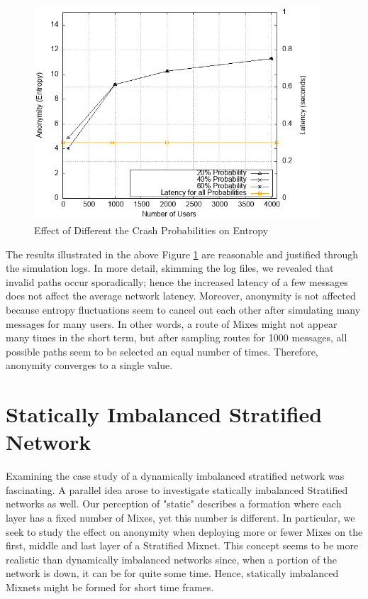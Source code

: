 \documentclass[logo,msc,cyber]{infthesis}   %
\begin{document}
\begin{figure}[h!]
    \centering
    \includegraphics[height=8cm]{figures/simulator_extentions/mix_failure.png}
    \caption{Effect of Different the Crash Probabilities on Entropy}
    \label{fig:dynamic-crash-probability}
\end{figure}    


The results illustrated in the above Figure \ref{fig:dynamic-crash-probability}
are reasonable and justified through the simulation logs. In more detail,
skimming the log files, we revealed that invalid paths occur sporadically; hence
the increased latency of a few messages does not affect the average network
latency. Moreover, anonymity is not affected because entropy fluctuations seem
to cancel out each other after simulating many messages for many users. In other
words, a route of Mixes might not appear many times in the short term, but after
sampling routes for 1000 messages, all possible paths seem to be selected an
equal number of times. Therefore, anonymity converges to a single value.

\section{Statically Imbalanced Stratified Network}

Examining the case study of a dynamically imbalanced stratified network was
fascinating. A parallel idea arose to investigate statically imbalanced
Stratified networks as well. Our perception of "static" describes a formation
where each layer has a fixed number of Mixes, yet this number is different. In
particular, we seek to study the effect on anonymity when deploying more or
fewer Mixes on the first, middle and last layer of a Stratified Mixnet. This
concept seems to be more realistic than dynamically imbalanced networks since,
when a portion of the network is down, it can be for quite some time. Hence,
statically imbalanced Mixnets might be formed for short time frames.
\end{document}
